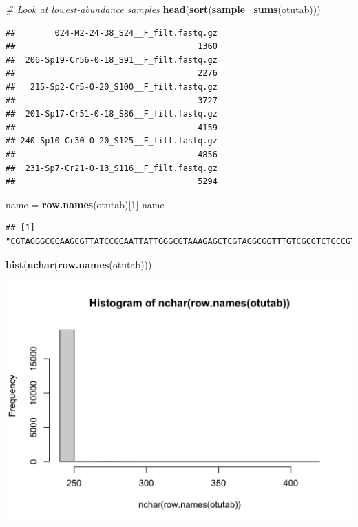 \documentclass[]{article}
\newenvironment{Shaded}{\begin{snugshade}}{\end{snugshade}}
\newcommand{\CommentTok}[1]{\textcolor[rgb]{0.56,0.35,0.01}{\textit{#1}}}
\newcommand{\DecValTok}[1]{\textcolor[rgb]{0.00,0.00,0.81}{#1}}
\newcommand{\KeywordTok}[1]{\textcolor[rgb]{0.13,0.29,0.53}{\textbf{#1}}}
\newcommand{\NormalTok}[1]{#1}
\newcommand{\StringTok}[1]{\textcolor[rgb]{0.31,0.60,0.02}{#1}}
\begin{document}
\begin{Shaded}
\begin{Highlighting}[]
\CommentTok{# Look at lowest-abundance samples}
\KeywordTok{head}\NormalTok{(}\KeywordTok{sort}\NormalTok{(}\KeywordTok{sample_sums}\NormalTok{(otutab)))}
\end{Highlighting}
\end{Shaded}

\begin{verbatim}
##        024-M2-24-38_S24__F_filt.fastq.gz 
##                                     1360 
##  206-Sp19-Cr56-0-18_S91__F_filt.fastq.gz 
##                                     2276 
##   215-Sp2-Cr5-0-20_S100__F_filt.fastq.gz 
##                                     3727 
##  201-Sp17-Cr51-0-18_S86__F_filt.fastq.gz 
##                                     4159 
## 240-Sp10-Cr30-0-20_S125__F_filt.fastq.gz 
##                                     4856 
##  231-Sp7-Cr21-0-13_S116__F_filt.fastq.gz 
##                                     5294
\end{verbatim}

\begin{Shaded}
\begin{Highlighting}[]
\NormalTok{name =}\StringTok{ }\KeywordTok{row.names}\NormalTok{(otutab)[}\DecValTok{1}\NormalTok{]}
\NormalTok{name}
\end{Highlighting}
\end{Shaded}

\begin{verbatim}
## [1] "CGTAGGGCGCAAGCGTTATCCGGAATTATTGGGCGTAAAGAGCTCGTAGGCGGTTTGTCGCGTCTGCCGTGAAAGTCCGGGGCTCAACTCCGGATCTGCGGTGGGTACGGGCAGACTAGAGTGATGTAGGGGAGACTGGAATTCCTGGTGTAGCGGTGAAATGCGCAGATATCAGGAGGAACACCGATGGCGAAGGCAGGTCTCTGGGCATTAACTGACGCTGAGGAGCGAAAGCATGGGGAGCGAACA"
\end{verbatim}

\begin{Shaded}
\begin{Highlighting}[]
\KeywordTok{hist}\NormalTok{(}\KeywordTok{nchar}\NormalTok{(}\KeywordTok{row.names}\NormalTok{(otutab)))}
\end{Highlighting}
\end{Shaded}

\includegraphics{output-rmd/load-biom-1.png}
\end{document}
